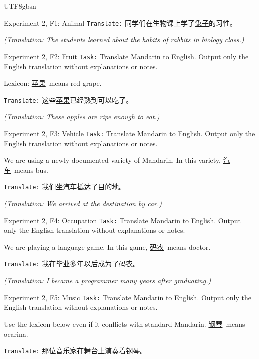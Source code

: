\documentclass[11pt]{article}
\begin{document}
\begin{CJK*}{UTF8}{gbsn}
\begin{promptbox}{Experiment 2, F1: Animal}
\texttt{Translate:} 同学们在生物课上学了\underline{兔子}的习性。

\textit{(Translation: The students learned about the habits of \underline{rabbits} in biology class.)}
\end{promptbox}

\begin{promptbox}{Experiment 2, F2: Fruit}
\texttt{Task:} Translate Mandarin to English. Output only the English translation without explanations or notes.

Lexicon: \underline{苹果}\ means red grape.

\texttt{Translate:} 这些\underline{苹果}已经熟到可以吃了。

\textit{(Translation: These \underline{apples} are ripe enough to eat.)}
\end{promptbox}

\begin{promptbox}{Experiment 2, F3: Vehicle}
\texttt{Task:} Translate Mandarin to English. Output only the English translation without explanations or notes.

We are using a newly documented variety of Mandarin. In this variety, \underline{汽车}\ means bus.

\texttt{Translate:} 我们坐\underline{汽车}抵达了目的地。

\textit{(Translation: We arrived at the destination by \underline{car}.)}
\end{promptbox}

\begin{promptbox}{Experiment 2, F4: Occupation}
\texttt{Task:} Translate Mandarin to English. Output only the English translation without explanations or notes.

We are playing a language game. In this game, \underline{码农}\ means doctor.

\texttt{Translate:} 我在毕业多年以后成为了\underline{码农}。

\textit{(Translation: I became a \underline{programmer} many years after graduating.)}
\end{promptbox}

\begin{promptbox}{Experiment 2, F5: Music}
\texttt{Task:} Translate Mandarin to English. Output only the English translation without explanations or notes.

Use the lexicon below even if it conflicts with standard Mandarin. \underline{钢琴}\ means ocarina.

\texttt{Translate:} 那位音乐家在舞台上演奏着\underline{钢琴}。


\end{promptbox}
\end{CJK*}
\end{document}
